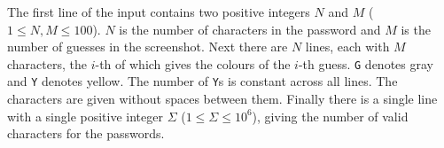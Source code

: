 

The first line of the input contains two positive integers
$N$ and $M$ ($1 \leq N, M \leq 100$). $N$ is the number of characters in the
password and $M$ is the number of guesses in the screenshot.
Next there are $N$ lines, each with $M$ characters, the $i$-th
of which gives the colours of the $i$-th guess. \texttt{G} denotes
gray and \texttt{Y} denotes yellow. The number of \texttt{Y}s is
constant across all lines. The characters are
given without spaces between them. 
Finally there is a single line with a single
positive integer $\Sigma$ ($1 \leq \Sigma \leq 10^6$), giving the number
of valid characters for the passwords.

